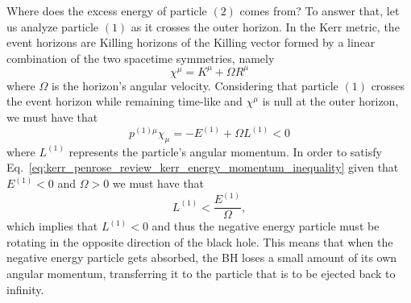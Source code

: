 Where does the excess energy of particle $(2)$ comes from? To answer that, let us analyze particle $(1)$ as it crosses the outer horizon. In the Kerr metric, the event horizons are Killing horizons of the Killing vector formed by a linear combination of the two spacetime symmetries, namely
%
\begin{equation}
  \chi^\mu = K^\mu + \Omega R^\mu
  \label{eq:kerr_penrose_review_kerr_killing_horizon}
\end{equation}
%
where $\Omega$ is the horizon's angular velocity. Considering that particle $(1)$ crosses the event horizon while remaining time-like and $\chi^\mu$ is null at the outer horizon, we must have that
%
\begin{equation}
  p^{(1)\mu}\chi_\mu = -E^{(1)} + \Omega L^{(1)} < 0
  \label{eq:kerr_penrose_review_kerr_energy_momentum_inequality}
\end{equation}
%
where $L^{(1)}$ represents the particle's angular momentum. In order to satisfy Eq.~\eqref{eq:kerr_penrose_review_kerr_energy_momentum_inequality} given that $E^{(1)} < 0$ and $\Omega > 0$ we must have that
%
\begin{equation}
  L^{(1)} < \frac{E^{(1)}}{\Omega},
  \label{eq:kerr_penrose_review_kerr_energy_momentum_inequality_L}
\end{equation}
%
which implies that $L^{(1)} < 0$ and thus the negative energy particle must be rotating in the opposite direction of the black hole. This means that when the negative energy particle gets absorbed, the BH loses a small amount of its own angular momentum, transferring it to the particle that is to be ejected back to infinity.

